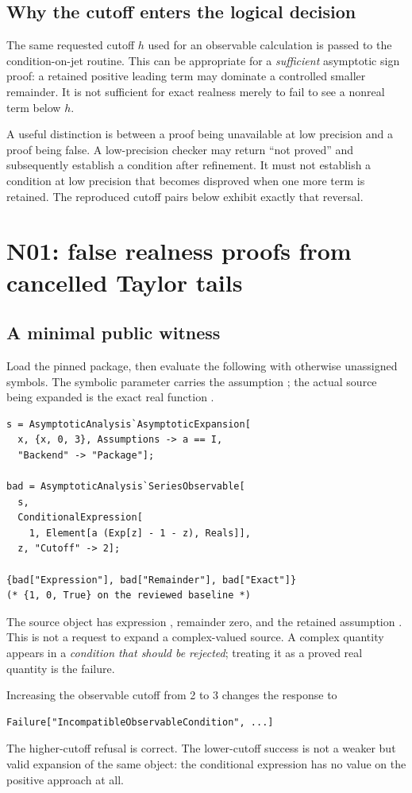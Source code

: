 \documentclass[11pt,letterpaper]{article}
\newcommand{\code}[1]{\texttt{\small\detokenize{#1}}}
\begin{document}
\subsection{Why the cutoff enters the logical decision}
The same requested cutoff \(h\) used for an observable calculation is passed to the condition-on-jet routine. This can be appropriate for a \emph{sufficient} asymptotic sign proof: a retained positive leading term may dominate a controlled smaller remainder. It is not sufficient for exact realness merely to fail to see a nonreal term below \(h\).

A useful distinction is between a proof being unavailable at low precision and a proof being false. A low-precision checker may return ``not proved'' and subsequently establish a condition after refinement. It must not establish a condition at low precision that becomes disproved when one more term is retained. The reproduced cutoff pairs below exhibit exactly that reversal.

\section{N01: false realness proofs from cancelled Taylor tails}
\subsection{A minimal public witness}
Load the pinned package, then evaluate the following with otherwise unassigned symbols. The symbolic parameter \code{a} carries the assumption \code{a == I}; the actual source being expanded is the exact real function \code{x}.
\begin{lstlisting}
s = AsymptoticAnalysis`AsymptoticExpansion[
  x, {x, 0, 3}, Assumptions -> a == I,
  "Backend" -> "Package"];

bad = AsymptoticAnalysis`SeriesObservable[
  s,
  ConditionalExpression[
    1, Element[a (Exp[z] - 1 - z), Reals]],
  z, "Cutoff" -> 2];

{bad["Expression"], bad["Remainder"], bad["Exact"]}
(* {1, 0, True} on the reviewed baseline *)
\end{lstlisting}
The source object has expression \code{x}, remainder zero, and the retained assumption \code{a == I}. This is not a request to expand a complex-valued source. A complex quantity appears in a \emph{condition that should be rejected}; treating it as a proved real quantity is the failure.

Increasing the observable cutoff from 2 to 3 changes the response to
\begin{lstlisting}
Failure["IncompatibleObservableCondition", ...]
\end{lstlisting}
The higher-cutoff refusal is correct. The lower-cutoff success is not a weaker but valid expansion of the same object: the conditional expression has no value on the positive approach at all.
\end{document}
